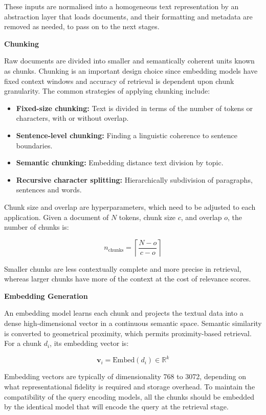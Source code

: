 These inputs are normalised into a homogeneous text representation by an abstraction layer that loads documents, and their formatting and metadata are removed as needed, to pass on to the next stages.

\textbf{Chunking}

Raw documents are divided into smaller and semantically coherent units known as chunks. Chunking is an important design choice since embedding models have fixed context windows and accuracy of retrieval is dependent upon chunk granularity. The common strategies of applying chunking include:
\begin{itemize}
    \item \textbf{Fixed-size chunking:} Text is divided in terms of the number of tokens or characters, with or without overlap.
    \item \textbf{Sentence-level chunking:} Finding a linguistic coherence to sentence boundaries.
    \item \textbf{Semantic chunking:} Embedding distance text division by topic.
    \item \textbf{Recursive character splitting:} Hierarchically subdivision of paragraphs, sentences and words.
\end{itemize}

Chunk size and overlap are hyperparameters, which need to be adjusted to each application. Given a document of $N$ tokens, chunk size $c$, and overlap $o$, the number of chunks is:

\begin{equation}
    n_{\text{chunks}} = \left\lceil \frac{N - o}{c - o} \right\rceil
\end{equation}

Smaller chunks are less contextually complete and more precise in retrieval, whereas larger chunks have more of the context at the cost of relevance scores.

\textbf{Embedding Generation}

An embedding model learns each chunk and projects the textual data into a dense high-dimensional vector in a continuous semantic space. Semantic similarity is converted to geometrical proximity, which permits proximity-based retrieval. For a chunk $d_i$, its embedding vector is:

\begin{equation}
    \mathbf{v}_i = \text{Embed}(d_i) \in \mathbb{R}^{k}
\end{equation}

Embedding vectors are typically of dimensionality 768 to 3072, depending on what representational fidelity is required and storage overhead. To maintain the compatibility of the query encoding models, all the chunks should be embedded by the identical model that will encode the query at the retrieval stage.

